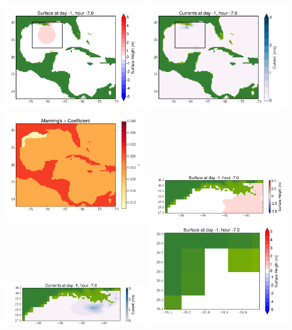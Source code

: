 \documentclass[11pt]{article}
\begin{document}
\vskip 10pt 
\includegraphics[width=0.475\textwidth]{frame0041fig1.png}
\includegraphics[width=0.475\textwidth]{frame0041fig2.png}
\vskip 10pt 
\includegraphics[width=0.475\textwidth]{frame0041fig3.png}
\includegraphics[width=0.475\textwidth]{frame0041fig4.png}
\vskip 10pt 
\includegraphics[width=0.475\textwidth]{frame0041fig5.png}
\includegraphics[width=0.475\textwidth]{frame0041fig6.png}
\end{document}
